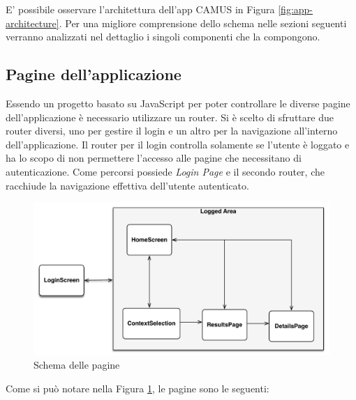 E’ possibile osservare l’architettura dell’app CAMUS in Figura \ref{fig:app-architecture}. Per una migliore comprensione dello schema nelle sezioni seguenti verranno analizzati nel dettaglio i singoli componenti che la compongono.

\subsection{Pagine dell'applicazione}

Essendo un progetto basato su JavaScript per poter controllare le diverse pagine dell'applicazione è necessario utilizzare un router. Si è scelto di sfruttare due router diversi, uno per gestire il login e un altro per la navigazione all'interno dell'applicazione. Il router per il login controlla solamente se l'utente è loggato e ha lo scopo di non permettere l'accesso alle pagine che necessitano di autenticazione. Come percorsi possiede \emph{Login Page} e il secondo router, che racchiude la navigazione effettiva dell'utente autenticato.

\begin{figure}[H]
	\centering
	\includegraphics[width=\textwidth]{6-implementazione-app/immagini/screen-schema.pdf}
	\caption{Schema delle pagine}\label{fig:screen-schema}
\end{figure}

Come si può notare nella Figura \ref{fig:screen-schema}, le pagine sono le seguenti:

